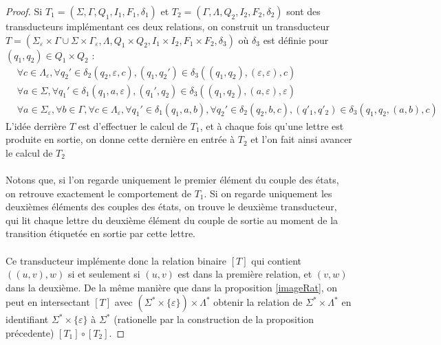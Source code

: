 \documentclass{scrartcl}
\begin{document}
\begin{flushleft}
\begin{proof}
    Si $T_1 = (\Sigma, \Gamma, Q_1, I_1, F_1, \delta_1)$ et $T_2 = (\Gamma, \Lambda, Q_2, I_2, F_2, \delta_2)$ sont des transducteurs implémentant ces deux relations,
    on construit un transducteur
    $T = (\Sigma_{\varepsilon} \times \Gamma \cup \Sigma \times \Gamma_{\varepsilon}, \Lambda, Q_1 \times Q_2, I_1 \times I_2, F_1 \times F_2, \delta_3)$
    où $\delta_3$ est définie pour $(q_1, q_2) \in Q_1 \times Q_2$ :
    \begin{equation*}
        \begin{split}
            &\forall c \in \Lambda_{\varepsilon}, \forall q_2' \in \delta_2(q_2, \varepsilon, c), (q_1, q_2') \in \delta_3((q_1, q_2),
            (\varepsilon, \varepsilon), c)\\
            &\forall a \in \Sigma, \forall q_1' \in \delta_1(q_1, a, \varepsilon), (q_1', q_2) \in \delta_3((q_1, q_2), (a, \varepsilon), \varepsilon)\\
            &\forall a \in \Sigma_{\varepsilon}, \forall b \in \Gamma, \forall c \in \Lambda_{\varepsilon},
            \forall q_1' \in \delta_1(q_1, a, b), \forall q_2' \in \delta_2(q_2, b, c), (q'_1, q'_2) \in \delta_3(q_1, q_2, (a, b), c)
        \end{split}
    \end{equation*}
    L'idée derrière $T$ est d'effectuer le calcul de $T_1$, et à chaque fois qu'une lettre est produite en sortie, on donne cette dernière en entrée
    à $T_2$ et l'on fait ainsi avancer le calcul de $T_2$
    \\~\\
    Notons que, si l'on regarde uniquement le premier élément du couple des états, on retrouve exactement le comportement de $T_1$.
    Si on regarde uniquement les deuxièmes éléments des couples des états, on trouve le deuxième transducteur, qui lit chaque lettre du deuxième élément
    du couple de sortie au moment de la transition étiquetée en sortie par cette lettre.
    \\~\\
    Ce transducteur implémente donc la relation binaire $[T]$ qui contient $((u, v), w)$ si et seulement si $(u, v)$ est dans la première relation,
    et $(v, w)$ dans la deuxième. De la même manière que dans la proposition \ref{imageRat}, on peut en intersectant $[T]$
    avec $(\Sigma^* \times \{\varepsilon\}) \times \Lambda^*$ obtenir la relation de $\Sigma^* \times \Lambda^*$
    en identifiant $\Sigma^* \times \{\varepsilon\}$ à $\Sigma^*$ (rationelle par la construction de la proposition précedente) $[T_1] \circ [T_2]$.
\end{proof}


\end{flushleft}
\end{document}
